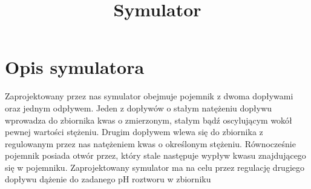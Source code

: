 \documentclass[polish,polish,a4paper,12pt]{article}
\begin{document}
	\title{Symulator}
	\date{}
	\maketitle
	\section{Opis symulatora}
	Zaprojektowany przez nas symulator obejmuje pojemnik z dwoma dopływami oraz jednym odpływem. Jeden z dopływów o stałym natężeniu dopływu wprowadza do zbiornika kwas o zmierzonym, stałym bądź oscylującym wokół pewnej wartości stężeniu. Drugim dopływem wlewa się do zbiornika z regulowanym przez nas natężeniem kwas o określonym stężeniu. Równocześnie pojemnik posiada otwór przez, który stale następuje wypływ kwasu znajdującego się w pojemniku. Zaprojektowany symulator ma na celu przez regulację drugiego dopływu dążenie do zadanego pH roztworu w zbiorniku\\
\end{document}
